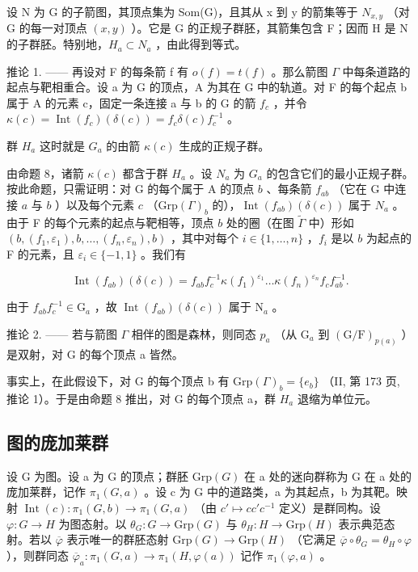 设 N 为 G 的子箭图，其顶点集为 Som(G)，且其从 x 到 y 的箭集等于 \(N_{x,y}\) （对 G 的每一对顶点 \((x,y)\) ）。它是 G 的正规子群胚，其箭集包含 F；因而 H 是 N 的子群胚。特别地，\(H_{a} \subset N_{a}\) ，由此得到等式。

推论 1. —— 再设对 F 的每条箭 f 有 \(o(f) = t(f)\) 。那么箭图 \(\Gamma\) 中每条道路的起点与靶相重合。设 a 为 G 的顶点，A 为其在 G 中的轨道。对 F 的每个起点 b 属于 A 的元素 c，固定一条连接 a 与 b 的 G 的箭 \(f_{c}\) ，并令 \(\kappa(c) = \operatorname{Int}(f_{c})(\delta(c)) = f_{c}\delta(c)f_{c}^{-1}\) 。

群 \(H_{a}\) 这时就是 \(G_{a}\) 的由箭 \(\kappa(c)\) 生成的正规子群。

由命题 8，诸箭 \(\kappa(c)\) 都含于群 \(H_a\) 。设 \(N_a\) 为 \(G_a\) 的包含它们的最小正规子群。按此命题，只需证明：对 G 的每个属于 A 的顶点 \(b\) 、每条箭 \(f_{ab}\) （它在 G 中连接 \(a\) 与 \(b\) ）以及每个元素 \(c\) （\(\mathrm{Grp}(\Gamma)_b\) 的），\(\operatorname{Int}(f_{ab})(\delta(c))\) 属于 \(N_a\) 。由于 F 的每个元素的起点与靶相等，顶点 \(b\) 处的圈（在图 \(\widetilde{\Gamma}\) 中）形如 \((b,(f_1,\varepsilon_1),b,\ldots,(f_n,\varepsilon_n),b)\) ，其中对每个 \(i\in\{1,\ldots,n\}\) ，\(f_i\) 是以 \(b\) 为起点的 F 的元素，且 \(\varepsilon_i\in\{-1,1\}\) 。我们有

\[
\operatorname{Int} (f _ {a b}) (\delta (c)) = f _ {a b} f _ {c} ^ {- 1} \kappa (f _ {1}) ^ {\varepsilon_ {1}} \dots \kappa (f _ {n}) ^ {\varepsilon_ {n}} f _ {c} f _ {a b} ^ {- 1}.
\]

由于 \(f_{ab}f_c^{-1} \in \mathrm{G}_a\) ，故 \(\operatorname{Int}(f_{ab})(\delta(c))\) 属于 \(\mathrm{N}_a\) 。

推论 2. —— 若与箭图 \(\Gamma\) 相伴的图是森林，则同态 \(p_a\) （从 \(\mathrm{G}_a\) 到 \((\mathrm{G} / \mathrm{F})_{p(a)}\) ）是双射，对 G 的每个顶点 a 皆然。

事实上，在此假设下，对 G 的每个顶点 b 有 \(\mathrm{Grp}(\Gamma)_{b}=\{e_{b}\}\) （II, 第 173 页, 推论 1）。于是由命题 8 推出，对 G 的每个顶点 a，群 \(H_{a}\) 退缩为单位元。

\subsection{图的庞加莱群}

设 G 为图。设 a 为 G 的顶点；群胚 \(\mathrm{Grp}(G)\) 在 a 处的迷向群称为 G 在 a 处的庞加莱群，记作 \(\pi_{1}(G,a)\) 。设 c 为 G 中的道路类，a 为其起点，b 为其靶。映射 \(\operatorname{Int}(c): \pi_{1}(G,b)\to\pi_{1}(G,a)\) （由 \(c'\mapsto cc'c^{-1}\) 定义）是群同构。设 \(\varphi:G\to H\) 为图态射。以 \(\theta_{G}:G\to\mathrm{Grp}(G)\) 与 \(\theta_{H}:H\to\mathrm{Grp}(H)\) 表示典范态射。若以 \(\overline{\varphi}\) 表示唯一的群胚态射 \(\mathrm{Grp}(G) \to \mathrm{Grp}(H)\) （它满足 \(\overline{\varphi}\circ\theta_{G}=\theta_{H}\circ\varphi\) ），则群同态 \(\overline{\varphi}_{a}:\pi_{1}(G,a)\to\pi_{1}(H,\varphi(a))\) 记作 \(\pi_{1}(\varphi,a)\) 。

